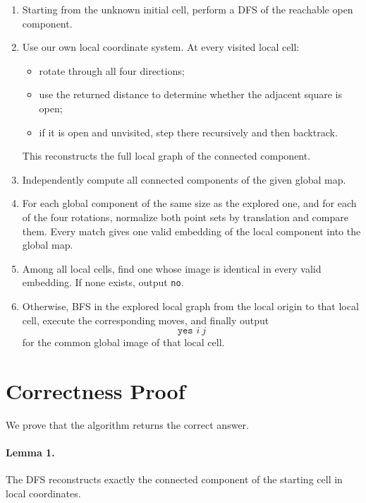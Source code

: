 \documentclass[11pt]{article}
\begin{document}
\begin{enumerate}[leftmargin=*]
    \item Starting from the unknown initial cell, perform a DFS of the reachable open component.

    \item Use our own local coordinate system. At every visited local cell:
    \begin{itemize}[leftmargin=*]
        \item rotate through all four directions;
        \item use the returned distance to determine whether the adjacent square is open;
        \item if it is open and unvisited, step there recursively and then backtrack.
    \end{itemize}
    This reconstructs the full local graph of the connected component.

    \item Independently compute all connected components of the given global map.

    \item For each global component of the same size as the explored one, and for each of the four rotations, normalize both point sets by translation and compare them. Every match gives one valid embedding of the local component into the global map.

    \item Among all local cells, find one whose image is identical in every valid embedding. If none exists, output \texttt{no}.

    \item Otherwise, BFS in the explored local graph from the local origin to that local cell, execute the corresponding moves, and finally output
    \[
    \texttt{yes } i\ j
    \]
    for the common global image of that local cell.
\end{enumerate}

\section*{Correctness Proof}

We prove that the algorithm returns the correct answer.

\paragraph{Lemma 1.}
The DFS reconstructs exactly the connected component of the starting cell in local coordinates.
\end{document}
